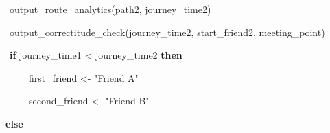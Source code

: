 \documentclass[12pt]{article}
\begin{document}
\begin{adjustwidth}{0.5in}{0.0in}
\begin{justify}
{\fontsize{8pt}{9.6pt}\selectfont \ \ \  output\_route\_analytics(path2, journey\_time2)\par}
\end{justify}\par

\end{adjustwidth}

\begin{adjustwidth}{0.5in}{0.0in}
\begin{justify}
{\fontsize{8pt}{9.6pt}\selectfont \ \ \  output\_correctitude\_check(journey\_time2, start\_friend2, meeting\_point)\par}
\end{justify}\par

\end{adjustwidth}

\begin{adjustwidth}{0.5in}{0.0in}
\begin{justify}
{\fontsize{8pt}{9.6pt}\selectfont \ \ \  \textbf{if} journey\_time1 < journey\_time2 \textbf{then}\par}
\end{justify}\par

\end{adjustwidth}

\begin{adjustwidth}{0.5in}{0.0in}
\begin{justify}
{\fontsize{8pt}{9.6pt}\selectfont \ \ \ \ \ \ \  first\_friend <- "Friend A"\par}
\end{justify}\par

\end{adjustwidth}

\begin{adjustwidth}{0.5in}{0.0in}
\begin{justify}
{\fontsize{8pt}{9.6pt}\selectfont \ \ \ \ \ \ \  second\_friend <- "Friend B"\par}
\end{justify}\par

\end{adjustwidth}

\begin{adjustwidth}{0.5in}{0.0in}
\begin{justify}
{\fontsize{8pt}{9.6pt}\selectfont \  \textbf{\  else}\par}
\end{justify}\par

\end{adjustwidth}
\end{document}
